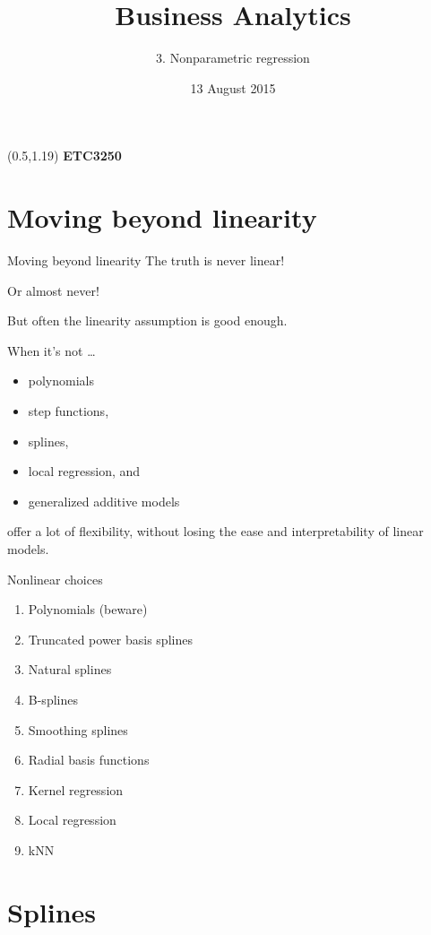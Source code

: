 \documentclass[14pt]{beamer}
\title[3. Nonparametric regression]{Business Analytics}
\author{3. Nonparametric regression}
\date{13 August 2015}
\begin{document}
\begin{frame}[plain]{}
\maketitle
\begin{textblock}{11}(0.5,1.19){\color{white}\large
\textbf{ETC3250}}
\end{textblock}
\end{frame}

\section{Moving beyond linearity}

\begin{frame}{Moving beyond linearity}
The truth is never linear!\pause

Or almost never!\pause

But often the linearity assumption is good enough.\pause

When it's not \dots
\begin{itemize}
\item polynomials
\item step functions,
\item splines,
\item local regression, and
\item generalized additive models
\end{itemize}
offer a lot of flexibility, without losing the ease and
interpretability of linear models.

\end{frame}
\begin{frame}{Nonlinear choices}
\begin{enumerate}
\item Polynomials (beware)
\item Truncated power basis splines
\item Natural splines
\item B-splines
\item Smoothing splines
\item Radial basis functions
\item Kernel regression
\item Local regression
\item kNN
\end{enumerate}
\end{frame}

\section{Splines}
\end{document}
